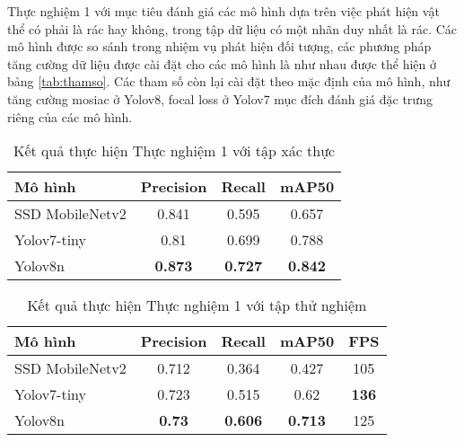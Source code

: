 \documentclass[../the.tex]{subfiles}
\begin{document}
{\fontsize{13}{12} \selectfont
Thực nghiệm 1 với mục tiêu đánh giá các mô hình dựa trên việc phát hiện vật thể có phải là rác hay không, trong tập dữ liệu có một nhãn duy nhất là rác.
Các mô hình được so sánh trong nhiệm vụ phát hiện đối tượng, các phương pháp tăng cường dữ liệu được cài đặt cho các mô hình là như nhau được thể hiện ở bảng \ref{tab:thamso}.
Các tham số còn lại cài đặt theo mặc định của mô hình, như tăng cường mosiac ở Yolov8, focal loss ở Yolov7 mục đích đánh giá đặc trưng riêng của các mô hình.

}
\begin{table}[h!]
    \centering
    \caption{Kết quả thực hiện Thực nghiệm 1 với tập xác thực}
    \begin{tabular}{|l|c|c|c|}
        \hline
        \textbf{Mô hình}  & \textbf{Precision} & \textbf{Recall} & \textbf{mAP50} \\ \hline
        SSD   MobileNetv2 & 0.841              & 0.595           & 0.657          \\ \hline
        Yolov7-tiny       & 0.81               & 0.699           & 0.788          \\ \hline
        Yolov8n           & \textbf{0.873}     & \textbf{0.727}  & \textbf{0.842} \\ \hline
    \end{tabular}
    \label{tab:thucnghiem1.1}
\end{table}

\begin{table}[h!]
    \centering
    \caption{Kết quả thực hiện Thực nghiệm 1 với tập thử nghiệm}
    \begin{tabular}{|l|c|c|c|c|}
        \hline
        \textbf{Mô hình} & \textbf{Precision} & \textbf{Recall} & \textbf{mAP50} & \multicolumn{1}{l|}{\textbf{FPS}} \\ \hline
        SSD MobileNetv2  & 0.712              & 0.364           & 0.427          & 105                               \\ \hline
        Yolov7-tiny      & 0.723              & 0.515           & 0.62           & \textbf{136}                      \\ \hline
        Yolov8n          & \textbf{0.73}      & \textbf{0.606}  & \textbf{0.713} & 125                               \\ \hline
    \end{tabular}
    \label{tab:thucnghiem1.2}
\end{table}
\end{document}
